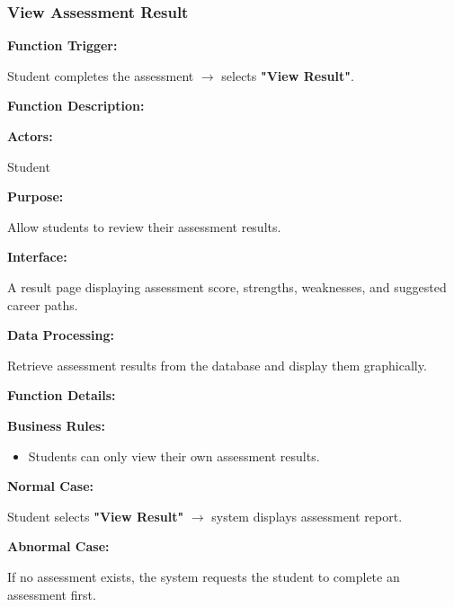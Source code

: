 \subsubsection{View Assessment Result}

\textbf{Function Trigger:}

Student completes the assessment $\rightarrow$ selects \textbf{"View Result"}.

\vspace{0.3cm}

\textbf{Function Description:}

\textbf{Actors:}

Student

\vspace{0.2cm}

\textbf{Purpose:}

Allow students to review their assessment results.

\vspace{0.2cm}

\textbf{Interface:}

A result page displaying assessment score, strengths, weaknesses, and suggested career paths.

\vspace{0.2cm}

\textbf{Data Processing:}

Retrieve assessment results from the database and display them graphically.

\vspace{0.3cm}

\textbf{Function Details:}

\textbf{Business Rules:}

\begin{itemize}
\item Students can only view their own assessment results.
\end{itemize}

\textbf{Normal Case:}

Student selects \textbf{"View Result"} $\rightarrow$ system displays assessment report.

\textbf{Abnormal Case:}

If no assessment exists, the system requests the student to complete an assessment first.

%

